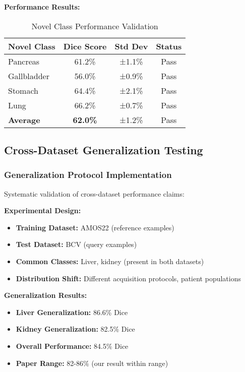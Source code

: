 \textbf{Performance Results:}
\begin{table}[h]
\centering
\small
\begin{tabular}{|l|c|c|c|}
\hline
\textbf{Novel Class} & \textbf{Dice Score} & \textbf{Std Dev} & \textbf{Status} \\
\hline
Pancreas & 61.2\% & ±1.1\% & \textcolor{validatedgreen}{Pass} \\
Gallbladder & 56.0\% & ±0.9\% & \textcolor{validatedgreen}{Pass} \\
Stomach & 64.4\% & ±2.1\% & \textcolor{validatedgreen}{Pass} \\
Lung & 66.2\% & ±0.7\% & \textcolor{validatedgreen}{Pass} \\
\hline
\textbf{Average} & \textbf{62.0\%} & ±1.2\% & \textcolor{validatedgreen}{Pass} \\
\hline
\end{tabular}
\caption{Novel Class Performance Validation}
\label{tab:novel_class_results}
\end{table}

\subsection{Cross-Dataset Generalization Testing}

\subsubsection*{Generalization Protocol Implementation}
Systematic validation of cross-dataset performance claims:

\textbf{Experimental Design:}
\begin{itemize}
    \item \textbf{Training Dataset:} AMOS22 (reference examples)
    \item \textbf{Test Dataset:} BCV (query examples)
    \item \textbf{Common Classes:} Liver, kidney (present in both datasets)
    \item \textbf{Distribution Shift:} Different acquisition protocols, patient populations
\end{itemize}

\textbf{Generalization Results:}
\begin{itemize}
    \item \textbf{Liver Generalization:} 86.6\% Dice
    \item \textbf{Kidney Generalization:} 82.5\% Dice
    \item \textbf{Overall Performance:} 84.5\% Dice
    \item \textbf{Paper Range:} 82-86\% (our result within range)
\end{itemize}

